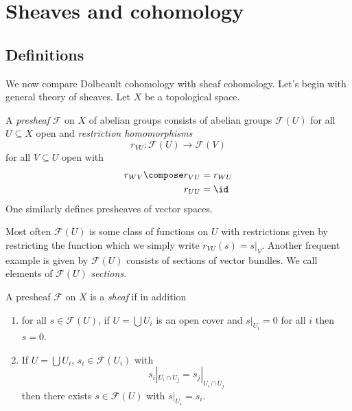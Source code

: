 \documentclass[a4paper]{article}
\begin{document}
\section{Sheaves and cohomology}

\subsection{Definitions}

We now compare Dolbeault cohomology with sheaf cohomology. Let's begin with general theory of sheaves. Let \(X\) be a topological space.

\begin{definition}[presheaf]
  A \emph{presheaf} \(\mathcal F\) on \(X\) of abelian groups consists of abelian groups \(\mathcal F(U)\) for all \(U \subseteq X\) open and \emph{restriction homomorphisms}
  \[
    r_{VU}: \mathcal F(U) \to \mathcal F(V)
  \]
  for all \(V \subseteq U\) open with
  \begin{align*}
    r_{WV} \compose r_{VU} &= r_{WU} \\
    r_{UU} &= \id
  \end{align*}
  One similarly defines presheaves of vector spaces.
\end{definition}

Most often \(\mathcal F(U)\) is some class of functions on \(U\) with restrictions given by restricting the function which we simply write \(r_{VU}(s) = s|_V\). Another frequent example is given by \(\mathcal F(U)\) consists of sections of vector bundles. We call elements of \(\mathcal F(U)\) \emph{sections}.

\begin{definition}[sheaf]
  A presheaf \(\mathcal F\) on \(X\) is a \emph{sheaf} if in addition
  \begin{enumerate}
  \item for all \(s \in \mathcal F(U)\), if \(U = \bigcup U_i\) is an open cover and \(s|_{U_i} = 0\) for all \(i\) then \(s = 0\).
  \item If \(U = \bigcup U_i\), \(s_i \in \mathcal F(U_i)\) with
    \[
      s_i|_{U_i \cap U_j} = s_j|_{U_i \cap U_j}
    \]
    then there exists \(s \in \mathcal F(U)\) with \(s|_{U_i} = s_i\).
  \end{enumerate}
\end{definition}
\end{document}
